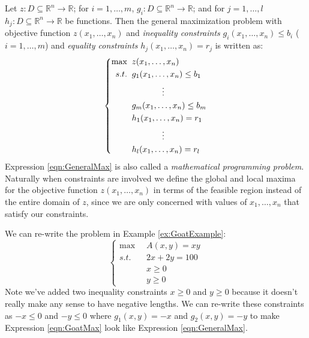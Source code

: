 Let $z:D\subseteq\mathbb{R}^n \rightarrow \mathbb{R}$; for $i=1,\dots,m$, $g_i:D\subseteq\mathbb{R}^n \rightarrow \mathbb{R}$; and for $j=1,\dots,l$ $h_j:D\subseteq\mathbb{R}^n \rightarrow \mathbb{R}$ be functions. Then the general maximization problem with objective function $z(x_1,\dots,x_n)$ and \textit{inequality constraints} $g_i(x_1,\dots,x_n) \leq b_i$ ($i=1,\dots,m$) and \textit{equality constraints} $h_j(x_1,\dots,x_n) = r_j$ is written as:
\begin{equation}
\left\{
\begin{aligned}
\max\;\;& z(x_1,\dots,x_n)\\
s.t.\;\;& g_1(x_1,\dots,x_n) \leq b_1\\
& \hspace*{0.5in}\vdots\\
& g_m(x_1,\dots,x_n) \leq b_m\\
& h_1(x_1,\dots,x_n) = r_1\\
&\hspace*{0.5in}\vdots\\
&h_l(x_1,\dots,x_n) = r_l
\end{aligned}
\right.
\label{eqn:GeneralMax}
\end{equation}
Expression \ref{eqn:GeneralMax} is also called a \textit{mathematical programming problem}. Naturally when constraints are involved we define the global and local maxima for the objective function $z(x_1,\dots,x_n)$ in terms of the feasible region instead of the entire domain of $z$, since we are only concerned with values of $x_1,\dots,x_n$ that satisfy our constraints.

\begin{example} We can re-write the problem in Example \ref{ex:GoatExample}:
\begin{equation}
\left\{
\begin{aligned}
\max \;\; & A(x,y) = x y \\
s.t. \;\; & 2x + 2y = 100\\
& x \geq 0\\
& y \geq 0 
\end{aligned}\right.
\label{eqn:GoatMax}
\end{equation}
Note we've added two inequality constraints $x \geq 0$ and $y \geq 0$ because it doesn't really make any sense to have negative lengths. We can re-write these constraints as $-x \leq 0$ and $-y \leq 0$ where $g_1(x,y) = -x$ and $g_2(x,y) = -y$ to make Expression \ref{eqn:GoatMax} look like Expression \ref{eqn:GeneralMax}.
\end{example}

